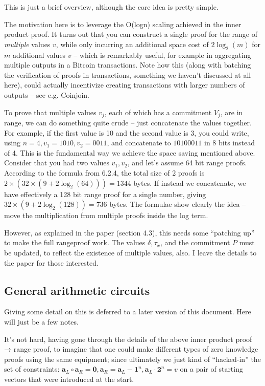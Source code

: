 \documentclass[10pt,a4paper]{article}
\begin{document}
This is just a brief overview, although the core idea is pretty simple.

The motivation here is to leverage the O(logn) scaling achieved in the
inner product proof. It turns out that you can construct a single proof
for the range of \emph{multiple} values $v$, while only incurring an
additional space cost of $2\log_2(m)$ for $m$ additional values $v$ -- which is remarkably
useful, for example in aggregating multiple outputs in a Bitcoin
transactions. Note how this (along with batching the verification of
proofs in transactions, something we haven't discussed at all here),
could actually incentivize creating transactions with larger numbers of
outputs -- see e.g. Coinjoin.

To prove that multiple values $v_j$, each of which has a commitment $V_j$, are in
range, we can do something quite crude -- just concatenate the values
together. For example, if the first value is 10 and the second value is
3, you could write, using $n=4, v_1=1010, v_2 = 0011$, and concatenate to $10100011$ in 8 bits instead of 4.
This is the fundamental way we achieve the space saving mentioned above.
Consider that you had two values $v_1, v_2$, and let's assume 64 bit range proofs.
According to the formula from 6.2.4, the total size of 2 proofs is $2 \times (32 \times (9 + 2\log_2(64))) = 1344$
bytes. If instead we concatenate, we have effectively a 128 bit range
proof for a single number, giving $32 \times (9 + 2\log_2(128)) = 736$ bytes. The formulae show clearly the
idea -- move the multiplication from multiple proofs inside the log
term.

However, as explained in the paper (section 4.3), this needs some
``patching up'' to make the full rangeproof work. The values $\delta, \tau_x$, and the
commitment $P$ must be updated, to reflect the existence of multiple values,
also. I leave the details to the paper for those interested.

\hypertarget{general-arithmetic-circuits}{%
\subsection[General arithmetic
circuits]{\texorpdfstring{\protect\hypertarget{anchor-67}{}{}General
arithmetic
circuits}{General arithmetic circuits}}\label{general-arithmetic-circuits}}

Giving some detail on this is deferred to a later version of this
document. Here will just be a few notes.

It's not hard, having gone through the details of the above inner
product proof → range proof, to imagine that one could make different
types of zero knowledge proofs using the same equipment; since
ultimately we just kind of ``hacked-in'' the set of constraints: $\textbf{a}_L \circ \textbf{a}_R = \textbf{0}, \textbf{a}_R = \textbf{a}_L - \textbf{1}^n, \textbf{a}_L \cdot \textbf{2}^n = v$ on a
pair of starting vectors that were introduced at the start.
\end{document}
